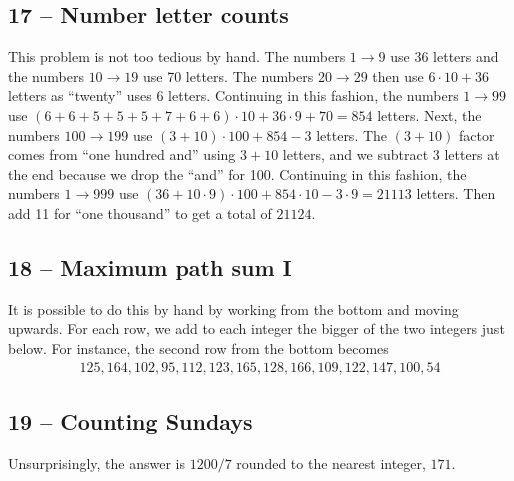 \documentclass{article}
\begin{document}
\subsection*{17 -- Number letter counts}
This problem is not too tedious by hand.
The numbers $1 \to 9$ use 36 letters and the numbers $10 \to 19$ use 70 letters.
The numbers $20 \to 29$ then use $6\cdot10 + 36$ letters as ``twenty'' uses 6 letters.
Continuing in this fashion, the numbers $1 \to 99$ use $(6+6+5+5+5+7+6+6)\cdot10 + 36\cdot9 + 70 = 854$ letters.
Next, the numbers $100 \to 199$ use $(3+10)\cdot100 + 854 - 3$ letters.
The $(3+10)$ factor comes from ``one hundred and'' using $3 + 10$ letters, and we subtract 3 letters at the end because we drop the ``and'' for 100. Continuing in this fashion, the numbers $1 \to 999$ use $(36 + 10\cdot9)\cdot100 + 854\cdot10 - 3\cdot9 = 21113$ letters. Then add 11 for ``one thousand'' to get a total of $\boxed{ 21124 }$.


\subsection*{18 -- Maximum path sum I}
It is possible to do this by hand by working from the bottom and moving upwards.
For each row, we add to each integer the bigger of the two integers just below.
For instance, the second row from the bottom becomes
\begin{align*}
	125, 164, 102, 95, 112, 123, 165, 128, 166, 109, 122, 147, 100, 54
\end{align*}


\subsection*{19 -- Counting Sundays}
Unsurprisingly, the answer is $1200/7$ rounded to the nearest integer, $\boxed{171}$.
\end{document}
